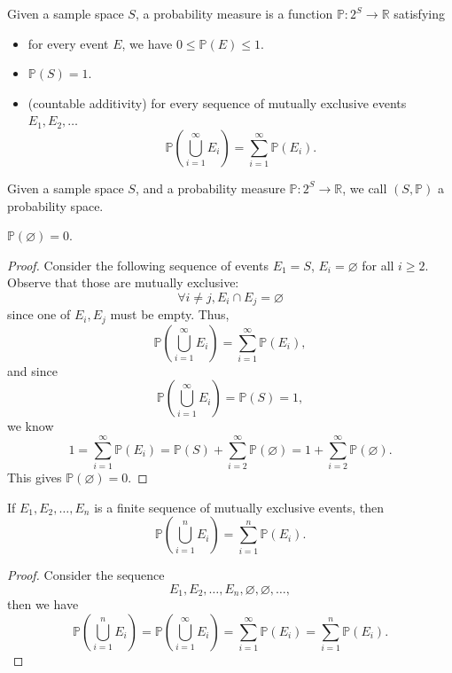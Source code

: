 \begin{definition}
    Given a sample space \(S\), a probability measure is a function \(\mathbb{P} : 2^S \to \mathbb{R} \) satisfying 
    \begin{itemize}
        \item [(i)] for every event \(E\), we have \(0 \le \mathbb{P} (E) \le 1\). 
        \item [(ii)] \(\mathbb{P} (S) = 1\). 
        \item [(iii)] (countable additivity) for every sequence of mutually exclusive events \(E_1, E_2, \dots \)
        \[
            \mathbb{P} \left( \bigcup_{i=1}^{\infty} E_i  \right) = \sum_{i=1}^{\infty} \mathbb{P} (E_i).  
        \]
    \end{itemize}   
\end{definition}

\begin{definition}
    Given a sample space \(S\), and a probability measure \(\mathbb{P} :2^S \to \mathbb{R} \), we call \((S, \mathbb{P} )\) a probability space.
\end{definition}

\begin{proposition}
    \(\mathbb{P} (\varnothing ) = 0\). 
\end{proposition}  

\begin{proof}
    Consider the following sequence of events \(E_1 = S\), \(E_i = \varnothing \) for all \(i \ge 2\). Observe that those are mutually exclusive: 
\[
    \forall i \neq j, E_i \cap E_j = \varnothing
\]   
since one of \(E_i, E_j\) must be empty. Thus, 
\[
    \mathbb{P} \left( \bigcup_{i=1}^{\infty} E_i  \right) = \sum_{i=1}^{\infty} \mathbb{P} (E_i),  
\] 
and since 
\[
    \mathbb{P} \left( \bigcup_{i=1}^{\infty} E_i  \right)  = \mathbb{P} (S) = 1,
\]
we know 
\[
    1 = \sum_{i=1}^{\infty} \mathbb{P} (E_i) = \mathbb{P} (S) + \sum_{i=2}^{\infty} \mathbb{P} (\varnothing ) = 1 + \sum_{i=2}^{\infty} \mathbb{P} (\varnothing ).   
\]
This gives \(\mathbb{P} (\varnothing ) = 0\).
\end{proof}

\begin{proposition}
    If \(E_1, E_2, \dots , E_n\) is a finite sequence of mutually exclusive events, then 
    \[
        \mathbb{P} \left( \bigcup_{i=1}^{n} E_i  \right) = \sum_{i=1}^n \mathbb{P} (E_i).  
    \] 
\end{proposition} 

\begin{proof}
    Consider the sequence 
    \[
        E_1, E_2, \dots , E_n, \varnothing , \varnothing , \dots,
    \]
    then we have 
    \[
         \mathbb{P} \left( \bigcup_{i=1}^{n} E_i  \right) = \mathbb{P} \left( \bigcup_{i=1}^{\infty} E_i  \right) = \sum_{i=1}^{\infty } \mathbb{P} (E_i) = \sum_{i=1}^n \mathbb{P} (E_i).   
    \]
\end{proof}

